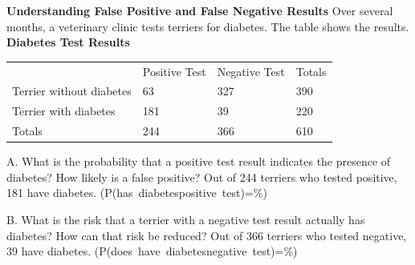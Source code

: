 \documentclass{article}
\newenvironment{example}[1]{}{}         %
\newcommand{\answer}[1]{}               %
\newcommand{\te}[1]{}                   %
\begin{document}
\begin{example}{5}
\textbf{Understanding False Positive and False Negative Results}
Over several months, a veterinary clinic tests terriers for diabetes. The table shows the results.
\textbf{Diabetes Test Results}
\begin{tabular}{llll}
 & Positive Test & Negative Test & Totals \\
Terrier without diabetes & 63 & 327 & 390 \\
Terrier with diabetes & 181 & 39 & 220 \\
Totals & 244 & 366 & 610 \\
\end{tabular}
\te{Callout to 63: A false positive result is a positive test result even though the condition is not present. Callout to 39: A false negative result is a negative test result even though the condition is present.}
A. What is the probability that a positive test result indicates the presence of diabetes? How likely is a false positive?
Out of 244 terriers who tested positive, 181 have diabetes.
(P(has\ diabetes\mid positive\ test)=\%)
\te{(P(does\ not\ have\ diabetes\mid positive\ test)) is the complement and equals 26\%.}
\answer{Therefore, a terrier that with a positive test for diabetes has a 74\% probability of actually having the condition. The chance of a false positive result is 26\%.}
\te{Printed ``a terrier that with''; likely ``a terrier with''. COMMUNICATE PRECISELY. The probability of a terrier having diabetes is (\frac{220}{610}\approx36\%). This differs from the probability of a false positive or a false negative.}
B. What is the risk that a terrier with a negative test result actually has diabetes? How can that risk be reduced?
Out of 366 terriers who tested negative, 39 have diabetes.
(P(does\ have\ diabetes\mid negative\ test)=\%)
\answer{Approximately 1 terrier in 10 has diabetes even when the test results are negative. If the dog is overweight or has other symptoms, repeating the test could reduce the risk of misdiagnosis.}
\te{REASON. Analyzing risk, the exposure to danger, harm, or loss, can help determine whether false results are acceptable or not.}
\end{example}
\end{document}
